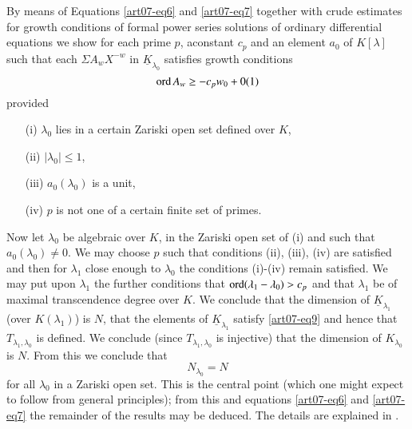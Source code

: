 \begin{method}\label{art07-method2}
By means of Equations \eqref{art07-eq6} and \eqref{art07-eq7} together with crude estimates for growth conditions of formal power series solutions of ordinary differential equations we show for each prime $p$, a\pageoriginale constant $c_{p}$ and an element $a_{0}$ of $K[\lambda]$ such that each $\Sigma A_{w}X^{-w}$ in $\underline{K}_{\lambda_{0}}$ satisfies growth conditions
\begin{equation}
\operatorname{\mathrm{ord}} A_{w}\geq -c_{p}w_{0}+0(1)\label{art07-eq9}
\end{equation}
provided
\begin{itemize}
\item[(i)] $\lambda_{0}$ lies in a certain Zariski open set defined over $K$,

\item[(ii)] $|\lambda_{0}|\leq 1$,

\item[(iii)] $a_{0}(\lambda_{0})$ is a unit,

\item[(iv)] $p$ is not one of a certain finite set of primes.
\end{itemize}
\end{method}

Now let $\lambda_{0}$ be algebraic over $K$, in the Zariski open set of (i) and such that $a_{0}(\lambda_{0})\neq 0$. We may choose $p$ such that conditions (ii), (iii), (iv) are satisfied and then for $\lambda_{1}$ close enough to $\lambda_{0}$ the conditions (i)-(iv) remain satisfied. We may put upon $\lambda_{1}$ the further conditions that $\operatorname{\mathrm{ord}} (\lambda_{1}-\lambda_{0})>c_{p}$ and that $\lambda_{1}$ be of maximal transcendence degree over $K$. We conclude that the dimension of $\underline{K}_{\lambda_{1}}$ (over $K(\lambda_{1})$) is $N$, that the elements of $\underline{K}_{\lambda_{1}}$ satisfy \eqref{art07-eq9} and hence that $T_{\lambda_{1},\lambda_{0}}$ is defined. We conclude (since $T_{\lambda_{1},\lambda_{0}}$ is injective) that the dimension of $K_{\lambda_{0}}$ is $N$. From this we conclude that
$$
N_{\lambda_{0}}=N
$$
for all $\lambda_{0}$ in a Zariski open set. This is the central point (which one might expect to follow from general principles); from this and equations \eqref{art07-eq6} and \eqref{art07-eq7} the remainder of the results may be deduced. The details are explained in \cite{art07-key4}.

